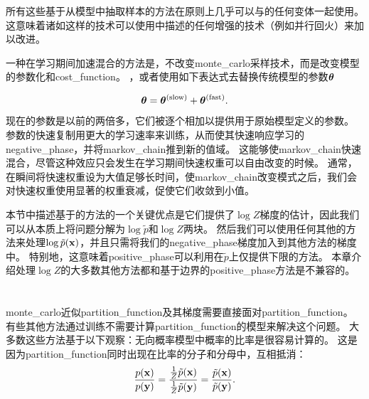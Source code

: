 所有这些基于从模型中抽取样本的方法在原则上几乎可以与的任何变体一起使用。
这意味着诸如这样的技术可以使用中描述的任何增强的技术（例如并行回火）来加以改进\citep{desjardins2010tempered,Cho10IJCNN-small}。


一种在学习期间加速混合的方法是，不改变\gls{monte_carlo}采样技术，而是改变模型的参数化和\gls{cost_function}。
，或者\citep{TielemanT2009-small}使用如下表达式去替换传统模型的参数$\boldsymbol{\theta}$

\begin{equation}
	\boldsymbol{\theta} = \boldsymbol{\theta}^{\text{(slow)}} + \boldsymbol{\theta}^{\text{(fast)}}.
\end{equation}
现在的参数是以前的两倍多，它们被逐个相加以提供用于原始模型定义的参数。
参数的快速复制用更大的学习速率来训练，从而使其快速响应学习的\gls{negative_phase}，并将\gls{markov_chain}推到新的值域。
这能够使\gls{markov_chain}快速混合，尽管这种效应只会发生在学习期间快速权重可以自由改变的时候。
通常，在瞬间将快速权重设为大值足够长时间，使\gls{markov_chain}改变模式之后，我们会对快速权重使用显著的权重衰减，促使它们收敛到小值。


本节中描述基于的方法的一个关键优点是它们提供了$\log Z$梯度的估计，因此我们可以从本质上将问题分解为$\log \tilde{p}$和$\log Z$两块。
然后我们可以使用任何其他的方法来处理$\log \tilde{p}(\mathbf{x})$，并且只需将我们的\gls{negative_phase}梯度加入到其他方法的梯度中。
特别地，这意味着\gls{positive_phase}可以利用在$\tilde{p}$上仅提供下限的方法。
本章介绍处理$\log Z$的大多数其他方法都和基于边界的\gls{positive_phase}方法是不兼容的。


\section{}
\label{sec:pseudolikelihood}
\gls{monte_carlo}近似\gls{partition_function}及其梯度需要直接面对\gls{partition_function}。
有些其他方法通过训练不需要计算\gls{partition_function}的模型来解决这个问题。
大多数这些方法基于以下观察：无向概率模型中概率的比率是很容易计算的。
这是因为\gls{partition_function}同时出现在比率的分子和分母中，互相抵消：
\begin{equation}
	\frac{p(\mathbf{x})}{ p(\mathbf{y}) } = \frac{ \frac{1}{Z} \tilde{p}(\mathbf{x}) }{ \frac{1}{Z} \tilde{p}(\mathbf{y}) } =
\frac{ \tilde{p}(\mathbf{x}) }{ \tilde{p}(\mathbf{y}) }.
\end{equation}



